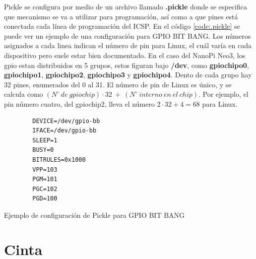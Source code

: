 \documentclass[12pt,letterpaper]{article}     %
\begin{document}
Pickle se configura por medio de un archivo llamado \textbf{.pickle} donde se especifica que mecanismo se va a utilizar 
para programación, así como a que pines está conectada cada línea de programación del ICSP. En el código 
\ref{code:.pickle} se puede ver un ejemplo de una configuración para GPIO BIT BANG.
Los números asignados a cada linea indican el número de pin para Linux, el cuál varía en cada dispositivo pero
suele estar bien documentado. En el caso del NanoPi Neo3, los gpio estan distribuidos en 5 grupos, estos figuran 
bajo \textbf{/dev}, como \textbf{gpiochipo0}, \textbf{gpiochipo1}, \textbf{gpiochipo2}, \textbf{gpiochipo3} y
\textbf{gpiochipo4}. Dento de cada grupo hay 32 pines, enumerados del 0 al 31. El número de pin de Linux es único,
y se calcula como $(N^\circ\ de\ gpiochip)\cdot32\ +\ (N^\circ\ interno\ en\ el\ chip)$. Por ejemplo, el pin número
cuatro, del gpiochip2, lleva el número $2\cdot32+4=68$ para Linux.

\begin{codigo}[!h]
	\begin{lstlisting}
		DEVICE=/dev/gpio-bb
		IFACE=/dev/gpio-bb
		SLEEP=1
		BUSY=0
		BITRULES=0x1000
		VPP=103
		PGM=101
		PGC=102
		PGD=100
	\end{lstlisting}
	\caption{Ejemplo de configuración de Pickle para GPIO BIT BANG}
	\label{code:.pickle}
\end{codigo}

\section{Cinta}
\end{document}
